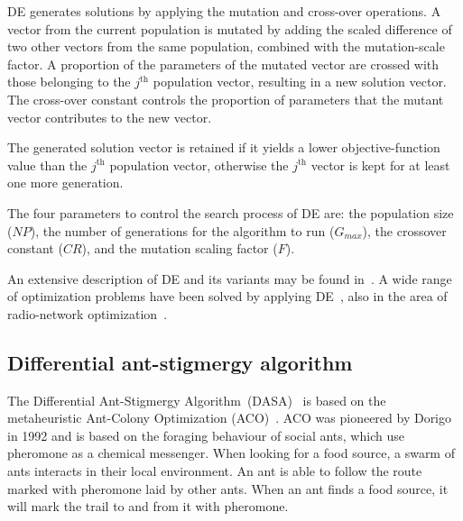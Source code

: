 DE generates solutions by applying the mutation and cross-over operations.
A vector from the current population is mutated by adding the scaled
difference of two other vectors from the same population, combined
with the mutation-scale factor. A proportion of the parameters of
the mutated vector are crossed with those belonging to the $j^{\mathrm{th}}$
population vector, resulting in a new solution vector. The cross-over
constant controls the proportion of parameters that the mutant vector
contributes to the new vector.

The generated solution vector is retained if it yields a lower objective-function
value than the $j^{\mathrm{th}}$ population vector, otherwise the
$j^{\mathrm{th}}$ vector is kept for at least one more generation.

The four parameters to control the search process of DE are: the population
size ($NP$), the number of generations for the algorithm to run ($G_{max}$),
the crossover constant ($CR$), and the mutation scaling factor ($F$).

An extensive description of DE and its variants may be found in~\cite{price2005differential_evolution}.
A wide range of optimization problems have been solved by applying
DE~\cite{das2010_differential_evolution_state_of_the_art}, also
in the area of radio-network optimization~\cite{Benedicic_Balancing_downlink_uplink_soft_handover_areas_in_UMTS_networks:2012,DaSilva-Analysis_of_parameter_settings_for_differential_evolution:2008,Mendes-A_differencial_evolution_algorithm_to_optimize_the_radio_network_design:2006}.


\subsection{Differential ant-stigmergy algorithm \label{sub:02-DASA}}

The Differential Ant-Stigmergy Algorithm~(DASA)~\cite{korosec2010_DASA}
is based on the metaheuristic Ant-Colony Optimization (ACO)~\cite{dorigo2006ant_colony_optimization}.
ACO was pioneered by Dorigo in 1992 and is based on the foraging behaviour
of social ants, which use pheromone as a chemical messenger. When
looking for a food source, a swarm of ants interacts in their local
environment. An ant is able to follow the route marked with pheromone
laid by other ants. When an ant finds a food source, it will mark
the trail to and from it with pheromone.

